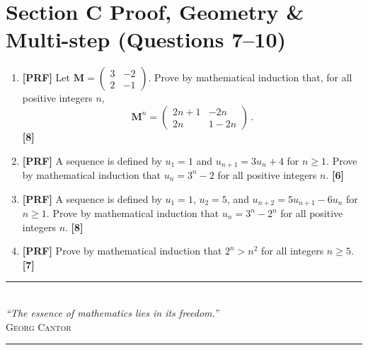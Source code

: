 \documentclass[11pt,a4paper]{article}
\begin{document}
\newpage
\section*{Section C \quad Proof, Geometry \& Multi-step \hfill{\normalfont\small(Questions 7--10)}}
\begin{enumerate}[resume]
\item \textbf{[PRF]} Let $\mathbf{M} = \begin{pmatrix} 3 & -2 \\ 2 & -1 \end{pmatrix}$.
Prove by mathematical induction that, for all positive integers $n$,
\[
\mathbf{M}^n = \begin{pmatrix} 2n+1 & -2n \\ 2n & 1-2n \end{pmatrix}\,.
\]
\hfill{\small\textbf{[8]}}

\item \textbf{[PRF]} A sequence is defined by $u_1 = 1$ and $u_{n+1} = 3u_n + 4$ for $n \geq 1$.
Prove by mathematical induction that $u_n = 3^n - 2$ for all positive integers $n$.
\hfill{\small\textbf{[6]}}

\item \textbf{[PRF]} A sequence is defined by $u_1 = 1$, $u_2 = 5$, and $u_{n+2} = 5u_{n+1} - 6u_n$ for $n \geq 1$.
Prove by mathematical induction that $u_n = 3^n - 2^n$ for all positive integers $n$.
\hfill{\small\textbf{[8]}}

\item \textbf{[PRF]} Prove by mathematical induction that $2^n > n^2$ for all integers $n \geq 5$.
\hfill{\small\textbf{[7]}}

\end{enumerate}

\vspace{14pt}
\begin{center}
  {\color{accentline}\rule{0.4\textwidth}{0.4pt}}\\[5pt]
  {\footnotesize\itshape\color{medgray} ``The essence of mathematics lies in its freedom.''}\\[2pt]
  {\scriptsize\scshape\color{medgray} Georg Cantor}\\[5pt]
  {\color{accentline}\rule{0.4\textwidth}{0.4pt}}
\end{center}
\end{document}
